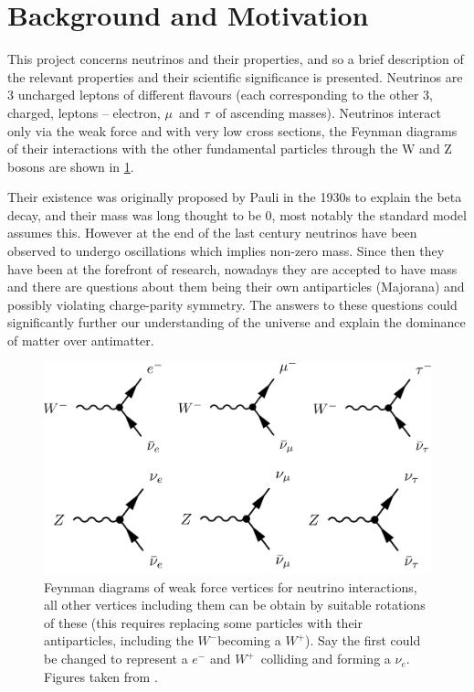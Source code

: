 \documentclass[a4paper,12pt]{article}
\newcommand{\Mu}{$\mu$}
\newcommand{\Tau}{$\tau$}
\newcommand{\Ne}{$\nu_e$}
\newcommand{\Wp}{$W^+$}
\newcommand{\Wm}{$W^-$}
\begin{document}
\newpage

\section{Background and Motivation}
This project concerns neutrinos and their properties, and so a brief description of the relevant properties and their scientific significance is presented.
Neutrinos are 3 uncharged leptons of different flavours (each corresponding to the other 3, charged, leptons -- electron, \Mu\ and \Tau\ of ascending masses).
Neutrinos interact only via the weak force and with very low cross sections, the Feynman diagrams of their interactions with the other fundamental particles through the W and Z bosons are shown in \cref{fig:nu_feyn}.

Their existence was originally proposed by Pauli in the 1930s to explain the beta decay, and their mass was long thought to be 0, most notably the standard model assumes this.
However at the end of the last century neutrinos have been observed to undergo oscillations which implies non-zero mass.
Since then they have been at the forefront of research, nowadays they are accepted to have mass and there are questions about them being their own antiparticles (Majorana) and possibly violating charge-parity symmetry.
The answers to these questions could significantly further our understanding of the universe and explain the dominance of matter over antimatter.

\begin{figure}[h]
    \centering
    \includegraphics{figures/NeutrinoFeynman.jpg}
    \caption{
        Feynman diagrams of weak force vertices for neutrino interactions, all other vertices including them can be obtain by suitable rotations of these
        (this requires replacing some particles with their antiparticles, including the \Wm becoming a \Wp).
        Say the first could be changed to represent a $e^-$ and \Wp\ colliding and forming a \Ne.
        Figures taken from \cite{potterFeynmanDiagramsParticlea}.
    }\label{fig:nu_feyn}
\end{figure}
\end{document}
